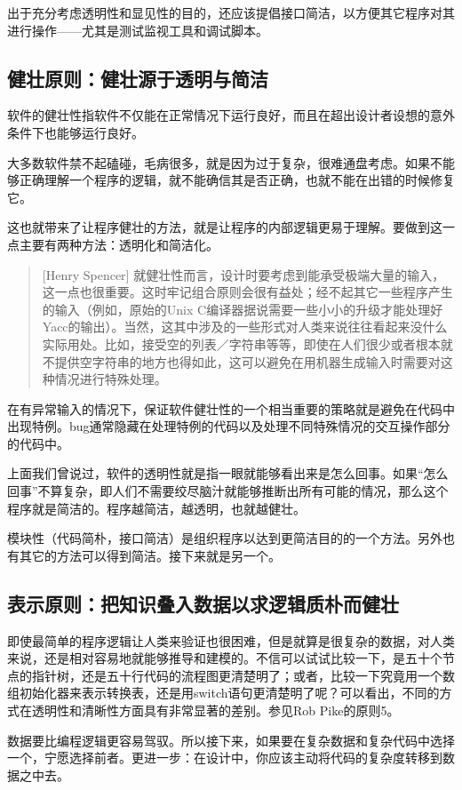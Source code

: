 \documentclass[12pt,oneside]{ctexbook}
\begin{document}
\begin{common-format}
出于充分考虑透明性和显见性的目的，还应该提倡接口简洁，以方便其它程序对其进行操作——尤其是测试监视工具和调试脚本。


\subsection{健壮原则：健壮源于透明与简洁}
软件的健壮性指软件不仅能在正常情况下运行良好，而且在超出设计者设想的意外条件下也能够运行良好。

大多数软件禁不起磕碰，毛病很多，就是因为过于复杂，很难通盘考虑。如果不能够正确理解一个程序的逻辑，就不能确信其是否正确，也就不能在出错的时候修复它。

这也就带来了让程序健壮的方法，就是让程序的内部逻辑更易于理解。要做到这一点主要有两种方法：透明化和简洁化。
\begin{quote}[Henry Spencer]
就健壮性而言，设计时要考虑到能承受极端大量的输入，这一点也很重要。这时牢记组合原则会很有益处；经不起其它一些程序产生的输入（例如，原始的Unix C编译器据说需要一些小小的升级才能处理好Yacc的输出）。当然，这其中涉及的一些形式对人类来说往往看起来没什么实际用处。比如，接受空的列表／字符串等等，即使在人们很少或者根本就不提供空字符串的地方也得如此，这可以避免在用机器生成输入时需要对这种情况进行特殊处理。
\end{quote}

在有异常输入的情况下，保证软件健壮性的一个相当重要的策略就是避免在代码中出现特例。bug通常隐藏在处理特例的代码以及处理不同特殊情况的交互操作部分的代码中。

上面我们曾说过，软件的透明性就是指一眼就能够看出来是怎么回事。如果“怎么回事”不算复杂，即人们不需要绞尽脑汁就能够推断出所有可能的情况，那么这个程序就是简洁的。程序越简洁，越透明，也就越健壮。

模块性（代码简朴，接口简洁）是组织程序以达到更简洁目的的一个方法。另外也有其它的方法可以得到简洁。接下来就是另一个。

\subsection{表示原则：把知识叠入数据以求逻辑质朴而健壮}
即使最简单的程序逻辑让人类来验证也很困难，但是就算是很复杂的数据，对人类来说，还是相对容易地就能够推导和建模的。不信可以试试比较一下，是五十个节点的指针树，还是五十行代码的流程图更清楚明了；或者，比较一下究竟用一个数组初始化器来表示转换表，还是用switch语句更清楚明了呢？可以看出，不同的方式在透明性和清晰性方面具有非常显著的差别。参见Rob Pike的原则5。

数据要比编程逻辑更容易驾驭。所以接下来，如果要在复杂数据和复杂代码中选择一个，宁愿选择前者。更进一步：在设计中，你应该主动将代码的复杂度转移到数据之中去。


\end{common-format}
\end{document}
